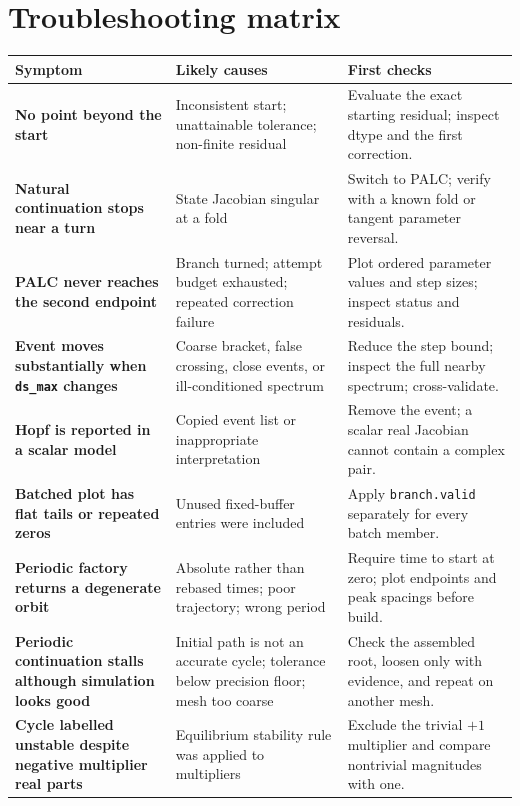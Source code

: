 \documentclass[11pt,oneside]{book}
\begin{document}
\chapter{Troubleshooting matrix}

\small
\begin{longtable}{>{\bfseries}p{}p{}p{}}
\toprule
Symptom & Likely causes & First checks\\
\midrule
\endhead
No point beyond the start &
Inconsistent start; unattainable tolerance; non-finite residual &
Evaluate the exact starting residual; inspect dtype and the first correction.\\
\addlinespace
Natural continuation stops near a turn &
State Jacobian singular at a fold &
Switch to PALC; verify with a known fold or tangent parameter reversal.\\
\addlinespace
PALC never reaches the second endpoint &
Branch turned; attempt budget exhausted; repeated correction failure &
Plot ordered parameter values and step sizes; inspect status and residuals.\\
\addlinespace
Event moves substantially when \texttt{ds\_max} changes &
Coarse bracket, false crossing, close events, or ill-conditioned spectrum &
Reduce the step bound; inspect the full nearby spectrum; cross-validate.\\
\addlinespace
Hopf is reported in a scalar model &
Copied event list or inappropriate interpretation &
Remove the event; a scalar real Jacobian cannot contain a complex pair.\\
\addlinespace
Batched plot has flat tails or repeated zeros &
Unused fixed-buffer entries were included &
Apply \texttt{branch.valid} separately for every batch member.\\
\addlinespace
Periodic factory returns a degenerate orbit &
Absolute rather than rebased times; poor trajectory; wrong period &
Require time to start at zero; plot endpoints and peak spacings before build.\\
\addlinespace
Periodic continuation stalls although simulation looks good &
Initial path is not an accurate cycle; tolerance below precision floor;
mesh too coarse &
Check the assembled root, loosen only with evidence, and repeat on another mesh.\\
\addlinespace
Cycle labelled unstable despite negative multiplier real parts &
Equilibrium stability rule was applied to multipliers &
Exclude the trivial $+1$ multiplier and compare nontrivial magnitudes with one.\\

\end{longtable}
\end{document}
